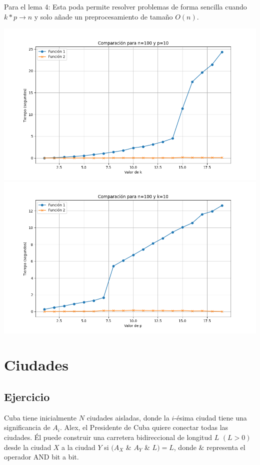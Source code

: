 \documentclass{article}
\begin{document}
Para el lema 4: Esta poda permite resolver problemas de forma sencilla cuando $k*p\rightarrow n$ y solo añade un preprocesamiento de tamaño $O(n)$.

\begin{center}
    \includegraphics[height = 0.5\textheight]{problems/2/k_plot.png}
    \includegraphics[height = 0.5\textheight]{problems/2/p_plot.png}
\end{center}

\section{Ciudades}

\subsection{Ejercicio}

Cuba tiene inicialmente $N$ ciudades aisladas, donde la $i$-ésima ciudad tiene una significancia de $A_i$. Alex, el Presidente de Cuba quiere conectar todas las ciudades. Él puede construir una carretera bidireccional de longitud $L$ $(L > 0)$ desde la ciudad $X$ a la ciudad $Y$ si $(A_X$ \& $A_Y$ \& $L) = L$, donde $\&$ representa el operador AND bit a bit.
\end{document}
